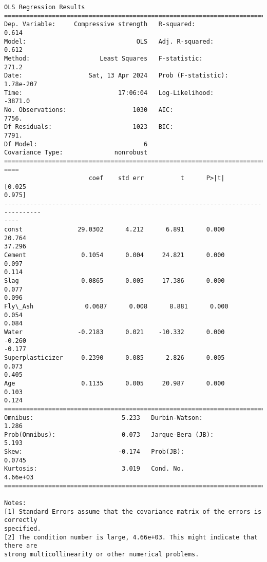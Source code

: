 \documentclass[11pt]{article}
\begin{document}
    \begin{Verbatim}[commandchars=\\\{\}]
                             OLS Regression Results
================================================================================
Dep. Variable:     Compressive strength   R-squared:                       0.614
Model:                              OLS   Adj. R-squared:                  0.612
Method:                   Least Squares   F-statistic:                     271.2
Date:                  Sat, 13 Apr 2024   Prob (F-statistic):          1.78e-207
Time:                          17:06:04   Log-Likelihood:                -3871.0
No. Observations:                  1030   AIC:                             7756.
Df Residuals:                      1023   BIC:                             7791.
Df Model:                             6
Covariance Type:              nonrobust
================================================================================
====
                       coef    std err          t      P>|t|      [0.025
0.975]
--------------------------------------------------------------------------------
----
const               29.0302      4.212      6.891      0.000      20.764
37.296
Cement               0.1054      0.004     24.821      0.000       0.097
0.114
Slag                 0.0865      0.005     17.386      0.000       0.077
0.096
Fly\_Ash              0.0687      0.008      8.881      0.000       0.054
0.084
Water               -0.2183      0.021    -10.332      0.000      -0.260
-0.177
Superplasticizer     0.2390      0.085      2.826      0.005       0.073
0.405
Age                  0.1135      0.005     20.987      0.000       0.103
0.124
==============================================================================
Omnibus:                        5.233   Durbin-Watson:                   1.286
Prob(Omnibus):                  0.073   Jarque-Bera (JB):                5.193
Skew:                          -0.174   Prob(JB):                       0.0745
Kurtosis:                       3.019   Cond. No.                     4.66e+03
==============================================================================

Notes:
[1] Standard Errors assume that the covariance matrix of the errors is correctly
specified.
[2] The condition number is large, 4.66e+03. This might indicate that there are
strong multicollinearity or other numerical problems.





    \end{Verbatim}
\end{document}
